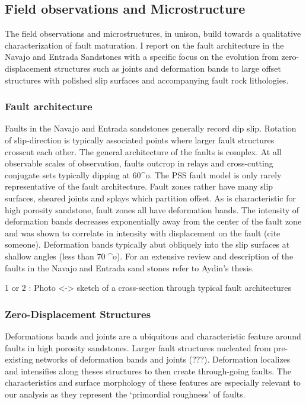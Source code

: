\documentclass[12pt,a4paper]{article}
\begin{document}
{\subsection{Field observations and Microstructure}

The field observations and microstructures, in unison, build towards a qualitative characterization of fault maturation. I report on the fault architecture in the Navajo and Entrada Sandstones with a specific focus on the evolution from zero-displacement structures such as joints and deformation bands to large offset structures with polished slip surfaces and accompanying fault rock lithologies.

\subsubsection{Fault architecture}

Faults in the Navajo and Entrada sandstones generally record dip slip. Rotation of slip-direction is typically associated points where larger fault structures crosscut each other.  The general architecture of the faults is complex. At all observable scales of observation, faults outcrop in relays and cross-cutting conjugate sets typically dipping at 60^o. The PSS fault model is only rarely representative of the fault architecture. Fault zones rather have many slip surfaces, sheared joints and splays which partition offset.  As is characteristic for high porosity sandstone, fault zones all have deformation bands. The intensity of deformation bands decreases exponentially away from the center of the fault zone and was shown to correlate in intensity with displacement on the fault (cite someone). Deformation bands typically abut obliquely into the slip surfaces at shallow angles (less than 70 ^o). For an extensive review and description of the faults in the Navajo and Entrada sand stones refer to Aydin’s thesis.

1 or 2 : Photo <-> sketch  of a cross-section through typical fault architectures

\subsubsection{Zero-Displacement Structures}

Deformations bands and joints are a ubiquitous and characteristic feature around faults in high porosity sandstones. Larger fault structures nucleated from pre-existing networks of deformation bands and joints (\cite{davatzes2000}???). Deformation localizes and intensifies along theses structures to then create through-going faults. The characteristics and surface morphology of these features are especially relevant to our analysis as they represent the ‘primordial roughness’ of faults. 

}
\end{document}
